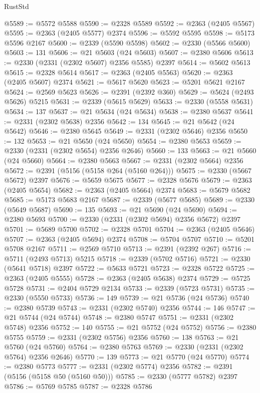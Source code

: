 \begin{lexlean}{RustStd}
\begin{coremodule}
@5589 := @5572 @5588
@5590 := @2328 @5589
@5592 := @2363 (@2405 @5567)
@5595 := @2363 (@2405 @5577) @2374
@5596 := @5592 @5595
@5598 := @5173 @5596 @2167
@5600 := @2339 (@5590 @5598)
@5602 := @2330 (@5566 @5600)
@5603 := 131
@5606 := @21 @5603 (@24 @5603)
@5607 := @2380 @5606
@5613 := @2330 (@2331 (@2302 @5607) @2356 @5585) @2397
@5614 := @5602 @5613
@5615 := @2328 @5614
@5617 := @2363 (@2405 @5563)
@5620 := @2363 (@2405 @5607) @2374
@5621 := @5617 @5620
@5623 := @5201 @5621 @2167
@5624 := @2569 @5623
@5626 := @2391 (@2392 @360)
@5629 := @5624 (@2493 @5626) @5215
@5631 := @2339 (@5615 @5629)
@5633 := @2330 (@5558 @5631)
@5634 := 137
@5637 := @21 @5634 (@24 @5634)
@5638 := @2380 @5637
@5641 := @2331 (@2302 @5638) @2356
@5642 := 134
@5645 := @21 @5642 (@24 @5642)
@5646 := @2380 @5645
@5649 := @2331 (@2302 @5646) @2356
@5650 := 132
@5653 := @21 @5650 (@24 @5650)
@5654 := @2380 @5653
@5659 := @2330 (@2331 (@2302 @5654) @2356 @2646)
@5660 := 133
@5663 := @21 @5660 (@24 @5660)
@5664 := @2380 @5663
@5667 := @2331 (@2302 @5664) @2356
@5672 := @2391 (@5156 (@5158 @264 (@5160 @264)))
@5675 := @2330 (@5667 @5672) @2397
@5676 := @5659 @5675
@5677 := @2328 @5676
@5679 := @2363 (@2405 @5654)
@5682 := @2363 (@2405 @5664) @2374
@5683 := @5679 @5682
@5685 := @5173 @5683 @2167
@5687 := @2339 (@5677 @5685)
@5689 := @2330 (@5649 @5687)
@5690 := 135
@5693 := @21 @5690 (@24 @5690)
@5694 := @2380 @5693
@5700 := @2330 (@2331 (@2302 @5694) @2356 @5672) @2397
@5701 := @5689 @5700
@5702 := @2328 @5701
@5704 := @2363 (@2405 @5646)
@5707 := @2363 (@2405 @5694) @2374
@5708 := @5704 @5707
@5710 := @5201 @5708 @2167
@5711 := @2569 @5710
@5713 := @2391 (@2392 @267)
@5716 := @5711 (@2493 @5713) @5215
@5718 := @2339 (@5702 @5716)
@5721 := @2330 (@5641 @5718) @2397
@5722 := @5633 @5721
@5723 := @2328 @5722
@5725 := @2363 (@2405 @5555)
@5728 := @2363 (@2405 @5638) @2374
@5729 := @5725 @5728
@5731 := @2404 @5729 @2134
@5733 := @2339 (@5723 @5731)
@5735 := @2330 (@5550 @5733)
@5736 := 149
@5739 := @21 @5736 (@24 @5736)
@5740 := @2380 @5739
@5743 := @2331 (@2302 @5740) @2356
@5744 := 146
@5747 := @21 @5744 (@24 @5744)
@5748 := @2380 @5747
@5751 := @2331 (@2302 @5748) @2356
@5752 := 140
@5755 := @21 @5752 (@24 @5752)
@5756 := @2380 @5755
@5759 := @2331 (@2302 @5756) @2356
@5760 := 138
@5763 := @21 @5760 (@24 @5760)
@5764 := @2380 @5763
@5769 := @2330 (@2331 (@2302 @5764) @2356 @2646)
@5770 := 139
@5773 := @21 @5770 (@24 @5770)
@5774 := @2380 @5773
@5777 := @2331 (@2302 @5774) @2356
@5782 := @2391 (@5156 (@5158 @50 (@5160 @50)))
@5785 := @2330 (@5777 @5782) @2397
@5786 := @5769 @5785
@5787 := @2328 @5786

\end{coremodule}
\end{lexlean}
